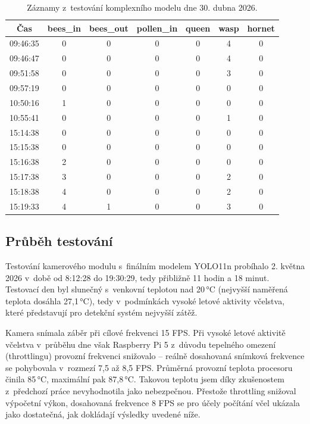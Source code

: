 \begin{table}[H]
    \centering
    \begin{tabular}{|c|c|c|c|c|c|c|}
        \hline
        \textbf{Čas} & \textbf{bees\_in} & \textbf{bees\_out} & \textbf{pollen\_in} & \textbf{queen} & \textbf{wasp} & \textbf{hornet} \\
        \hline
        09:46:35 & 0 & 0 & 0 & 0 & 4 & 0 \\
        \hline
        09:46:47 & 0 & 0 & 0 & 0 & 4 & 0 \\
        \hline
        09:51:58 & 0 & 0 & 0 & 0 & 3 & 0 \\
        \hline
        09:57:19 & 0 & 0 & 0 & 0 & 0 & 0 \\
        \hline
        10:50:16 & 1 & 0 & 0 & 0 & 0 & 0 \\
        \hline
        10:55:41 & 0 & 0 & 0 & 0 & 1 & 0 \\
        \hline
        15:14:38 & 0 & 0 & 0 & 0 & 0 & 0 \\
        \hline
        15:15:38 & 0 & 0 & 0 & 0 & 0 & 0 \\
        \hline
        15:16:38 & 2 & 0 & 0 & 0 & 0 & 0 \\
        \hline
        15:17:38 & 3 & 0 & 0 & 0 & 2 & 0 \\
        \hline
        15:18:38 & 4 & 0 & 0 & 0 & 2 & 0 \\
        \hline
        15:19:33 & 4 & 1 & 0 & 0 & 3 & 0 \\
        \hline
    \end{tabular}
    \caption{Záznamy z~testování komplexního modelu dne 30. dubna 2026.}
    \label{tab:komplexni_model_test}
\end{table}

\subsection*{Průběh testování}
Testování kamerového modulu s~finálním modelem YOLO11n probíhalo 2. května 2026 v~době od 8:12:28 do 19:30:29, tedy přibližně 11 hodin a 18 minut. Testovací den byl slunečný s~venkovní teplotou nad 20\,°C (nejvyšší naměřená teplota dosáhla 27,1\,°C), tedy v~podmínkách vysoké letové aktivity včelstva, které představují pro detekční systém nejvyšší zátěž.

Kamera snímala záběr při cílové frekvenci 15 FPS. Při vysoké letové aktivitě včelstva v~průběhu dne však Raspberry Pi 5 z~důvodu tepelného omezení (throttlingu) provozní frekvenci snižovalo -- reálně dosahovaná snímková frekvence se pohybovala v~rozmezí 7,5 až 8,5 FPS. Průměrná provozní teplota procesoru činila 85\,°C, maximální pak 87,8\,°C. Takovou teplotu jsem díky zkušenostem z~předchozí práce \cite{Chovancova2025} nevyhodnotila jako nebezpečnou. Přestože throttling snižoval výpočetní výkon, dosahovaná frekvence 8 FPS se pro účely počítání včel ukázala jako dostatečná, jak dokládají výsledky uvedené níže.

